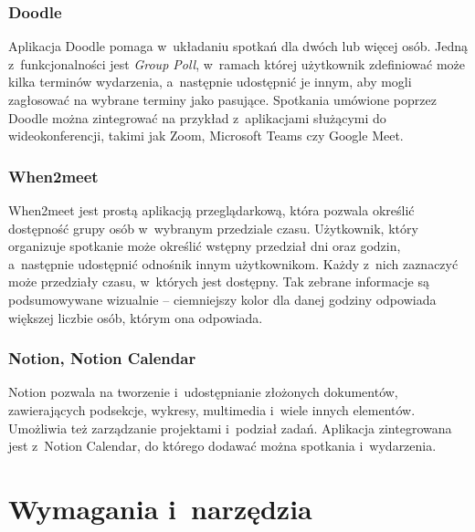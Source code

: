 \documentclass[a4paper,twoside,12pt]{book}
\newcommand{\obcy}[1]{\emph{#1}}
\newcommand{\english}[1]{{\selectlanguage{british}\obcy{#1}}}
\begin{document}
\subsection{Doodle}
Aplikacja Doodle pomaga w~układaniu spotkań dla dwóch lub więcej osób. Jedną z~funkcjonalności jest \english{Group Poll}, w~ramach której użytkownik zdefiniować może kilka terminów wydarzenia, a~następnie udostępnić je innym, aby mogli zagłosować na wybrane terminy jako pasujące. Spotkania umówione poprzez Doodle można zintegrować na przykład z~aplikacjami służącymi do wideokonferencji, takimi jak Zoom, Microsoft Teams czy Google Meet.
\subsection{When2meet}
When2meet jest prostą aplikacją przeglądarkową, która pozwala określić dostępność grupy osób w~wybranym przedziale czasu. Użytkownik, który organizuje spotkanie może określić wstępny przedział dni oraz godzin, a~następnie udostępnić odnośnik innym użytkownikom. Każdy z~nich zaznaczyć może przedziały czasu, w~których jest dostępny. Tak zebrane informacje są podsumowywane wizualnie -- ciemniejszy kolor dla danej godziny odpowiada większej liczbie osób, którym ona odpowiada.
\subsection{Notion, Notion Calendar}
Notion pozwala na tworzenie i~udostępnianie złożonych dokumentów, zawierających podsekcje, wykresy, multimedia i~wiele innych elementów. Umożliwia też zarządzanie projektami i~podział zadań. Aplikacja zintegrowana jest z~Notion Calendar, do którego dodawać można spotkania i~wydarzenia.


\chapter{Wymagania i~narzędzia}
\label{ch:wymagania-i-narzedzia}

\end{document}
